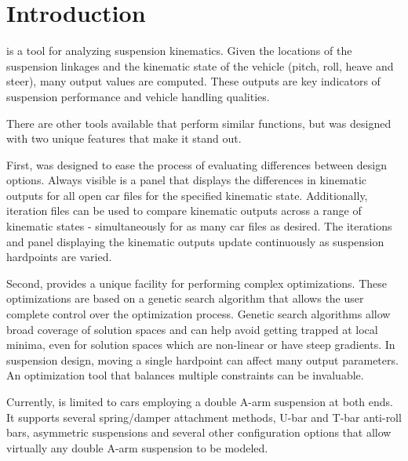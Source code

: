 \chapter{Introduction} \label{ch:introduction}


\vvase{} is a tool for analyzing suspension kinematics.  Given the locations of the suspension linkages and the kinematic state of the vehicle (pitch, roll, heave and steer), many output values are computed.  These outputs are key indicators of suspension performance and vehicle handling qualities.

There are other tools available that perform similar functions, but \vvase{} was designed with two unique features that make it stand out.

First, \vvase{} was designed to ease the process of evaluating differences between design options.  Always visible is a panel that displays the differences in kinematic outputs for all open car files for the specified kinematic state.  Additionally, iteration files can be used to compare kinematic outputs across a range of kinematic states - simultaneously for as many car files as desired.  The iterations and panel displaying the kinematic outputs update continuously as suspension hardpoints are varied.

Second, \vvase{} provides a unique facility for performing complex optimizations.  These optimizations are based on a genetic search algorithm that allows the user complete control over the optimization process.  Genetic search algorithms allow broad coverage of solution spaces and can help avoid getting trapped at local minima, even for solution spaces which are non-linear or have steep gradients.  In suspension design, moving a single hardpoint can affect many output parameters.  An optimization tool that balances multiple constraints can be invaluable.

Currently, \vvase{} is limited to cars employing a double A-arm suspension at both ends.  It supports several spring/damper attachment methods, U-bar and T-bar anti-roll bars, asymmetric suspensions and several other configuration options that allow virtually any double A-arm suspension to be modeled.
